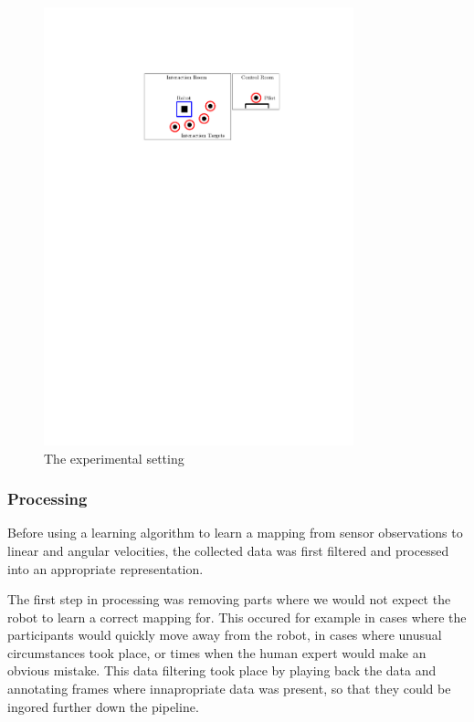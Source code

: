 \documentclass[a4paper,11pt]{report}
\begin{document}
	\begin{figure}
	\centering
	    \includegraphics[width=0.8\textwidth]{figures/experiment.pdf}
	  \caption[Conv layer]{The experimental setting}
	  \label{fig:experiment}
	\end{figure}

\subsubsection{Processing}

Before using a learning algorithm to learn a mapping from sensor observations to linear and angular velocities, the collected data was first filtered and processed into an appropriate representation. 

The first step in processing was removing parts where we would not expect the robot to learn a correct mapping for. This occured for example in cases where the participants would quickly move away from the robot, in cases where unusual circumstances took place, or times when the human expert would make an obvious mistake. This data filtering took place by playing back the data and annotating frames where innapropriate data was present, so that they could be ingored further down the pipeline. 
\end{document}
